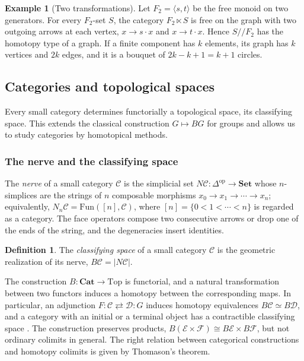 \documentclass[11pt]{amsart}
\theoremstyle{definition}
\newtheorem{definition}[teo]{Definition}
\newtheorem{example}[teo]{Example}
\theoremstyle{remark}
\numberwithin{figure}{section}%
\newcommand{\CC}{\mathcal{C}}
\newcommand{\DD}{\mathcal{D}}
\newcommand{\Fun}{\mathrm{Fun}}
\newcommand{\Set}{\mathbf{Set}}
\newcommand{\Cat}{\mathbf{Cat}}
\newcommand{\op}{\mathrm{op}}
\newcommand{\Top}{\mathrm{Top}}
\newcommand{\EE}{\mathcal{E}}
\newcommand{\FF}{\mathcal{F}}
\begin{document}
\begin{example}[Two transformations]
\label{ex:F2}
Let $F_2=\langle s,t\rangle$ be the free monoid on two generators. For every $F_2$-set $S$, the category $F_2\ltimes S$ is free on the graph with two outgoing arrows at each vertex, $x\to s\cdot x$ and $x\to t\cdot x$. Hence $S/\!/F_2$ has the homotopy type of a graph. If a finite component has $k$ elements, its graph has $k$ vertices and $2k$ edges, and it is a bouquet of $2k-k+1=k+1$ circles.
\end{example}

\subsection{Categories and topological spaces}
\label{subsec:categories-topological-spaces}

Every small category determines functorially a topological space, its classifying space. This extends the classical construction $G\mapsto BG$ for groups and allows us to study categories by homotopical methods.

\subsubsection{The nerve and the classifying space}

The \emph{nerve} of a small category $\CC$ is the simplicial set $N\CC\colon\Delta^{\op}\to\Set$ whose $n$-simplices are the strings of $n$ composable morphisms $x_0\to x_1\to\cdots\to x_n$; equivalently, $N_n\CC=\Fun([n],\CC)$, where $[n]=\{0<1<\cdots<n\}$ is regarded as a category. The face operators compose two consecutive arrows or drop one of the ends of the string, and the degeneracies insert identities.

\begin{definition}
The \emph{classifying space} of a small category $\CC$ is the geometric realization of its nerve, $B\CC=|N\CC|$.
\end{definition}

The construction $B\colon\Cat\to\Top$ is functorial, and a natural transformation between two functors induces a homotopy between the corresponding maps. In particular, an adjunction $F\colon\CC\rightleftarrows\DD\colon G$ induces homotopy equivalences $B\CC\simeq B\DD$, and a category with an initial or a terminal object has a contractible classifying space \cite{LEE,LEE2}. The construction preserves products, $B(\EE\times\FF)\cong B\EE\times B\FF$, but not ordinary colimits in general. The right relation between categorical constructions and homotopy colimits is given by Thomason's theorem.
\end{document}
